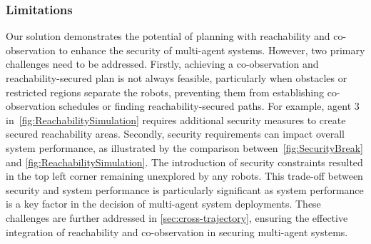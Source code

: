 \documentclass[10pt,twocolumn,twoside]{IEEEtran}
\newcommand{\news}{\color{blue}}
\begin{document}


\subsubsection{Limitations}\label{sec:reachability-discussion}
Our solution demonstrates the potential of planning with reachability and co-observation to enhance the security of multi-agent systems. {\news However, two primary challenges need to be addressed. Firstly, achieving a co-observation and reachability-secured plan is not always feasible, particularly when obstacles or restricted regions separate the robots, preventing them from establishing co-observation schedules or finding reachability-secured paths. For example, agent 3 in~\cref{fig:ReachabilitySimulation} requires additional security measures to create secured reachability areas. Secondly, security requirements can impact overall system performance, as illustrated by the comparison between~\cref{fig:SecurityBreak} and \cref{fig:ReachabilitySimulation}. The introduction of security constraints resulted in the top left corner remaining unexplored by any robots. This trade-off between security and system performance is particularly significant as system performance is a key factor in the decision of multi-agent system deployments. These challenges are further addressed in \cref{sec:cross-trajectory}, ensuring the effective integration of reachability and co-observation in securing multi-agent systems.}

\end{document}
